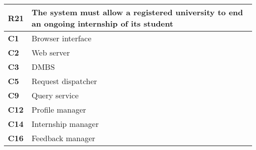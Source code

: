 \begin{table}[H]
    \centering
    \begin{tabular}{|l|m{10cm}|}
        \hline \textbf{R21} & The system must allow a registered university to end an ongoing internship of its student \\
        \hline \textbf{C1} & Browser interface \\
        \hline \textbf{C2} & Web server \\
        \hline \textbf{C3} & DMBS \\
        \hline \textbf{C5} & Request dispatcher \\
        \hline \textbf{C9} & Query service \\
        \hline \textbf{C12} & Profile manager \\
        \hline \textbf{C14} & Internship manager \\
        \hline \textbf{C16} & Feedback manager \\
        \hline
    \end{tabular}
\end{table}

